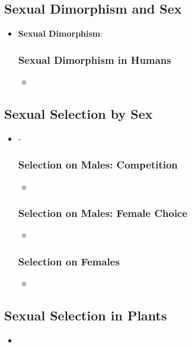 \documentclass[12pt,a4paper]{article}
\begin{document}
\subsection{Sexual Dimorphism and Sex}
\begin{itemize}
    \item \textbf{Sexual Dimorphism}:
    \subsubsection{Sexual Dimorphism in Humans}
    \begin{itemize}
        \item 
    \end{itemize}
\end{itemize}

\subsection{Sexual Selection by Sex}
\begin{itemize}
    \item -
    \subsubsection{Selection on Males: Competition}
    \begin{itemize}
        \item 
    \end{itemize}
    \subsubsection{Selection on Males: Female Choice}
    \begin{itemize}
        \item 
    \end{itemize}
    \subsubsection{Selection on Females}
    \begin{itemize}
        \item 
    \end{itemize}
\end{itemize}

\subsection{Sexual Selection in Plants}
\begin{itemize}
    \item 
\end{itemize}
\end{document}
